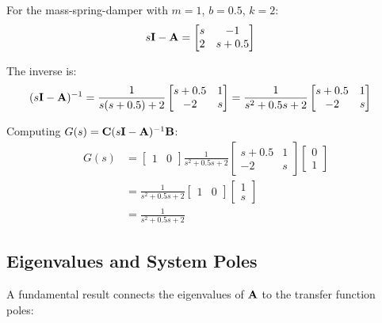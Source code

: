\begin{example}
For the mass-spring-damper with $m=1$, $b=0.5$, $k=2$:
\begin{align}
    s\mathbf{I} - \mathbf{A} &= \begin{bmatrix} s & -1 \\ 2 & s+0.5 \end{bmatrix}
\end{align}

The inverse is:
\begin{align}
    (s\mathbf{I} - \mathbf{A})^{-1} &= \frac{1}{s(s+0.5)+2} \begin{bmatrix} s+0.5 & 1 \\ -2 & s \end{bmatrix}
    = \frac{1}{s^2+0.5s+2} \begin{bmatrix} s+0.5 & 1 \\ -2 & s \end{bmatrix}
\end{align}

Computing $G(s) = \mathbf{C}(s\mathbf{I}-\mathbf{A})^{-1}\mathbf{B}$:
\begin{align}
    G(s) &= \begin{bmatrix} 1 & 0 \end{bmatrix}
    \frac{1}{s^2+0.5s+2} \begin{bmatrix} s+0.5 & 1 \\ -2 & s \end{bmatrix}
    \begin{bmatrix} 0 \\ 1 \end{bmatrix} \\
    &= \frac{1}{s^2+0.5s+2} \begin{bmatrix} 1 & 0 \end{bmatrix} \begin{bmatrix} 1 \\ s \end{bmatrix} \\
    &= \frac{1}{s^2+0.5s+2}
\end{align}
\end{example}

\subsection{Eigenvalues and System Poles}

A fundamental result connects the eigenvalues of $\mathbf{A}$ to the transfer function poles:

